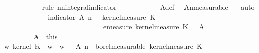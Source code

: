 \begin{isabellebody}
\ \ \ \ \ \ \ \ \ \ \isamarkupfalse%
\ {\isacharparenleft}{\kern0pt}rule\ nn{\isacharunderscore}{\kern0pt}integral{\isacharunderscore}{\kern0pt}indicator{\isacharparenright}{\kern0pt}\isanewline
\ \ \ \ \ \ \ \ \ \ \isamarkupfalse%
\ A{\isacharprime}{\kern0pt}{\isacharunderscore}{\kern0pt}def\ \isamarkupfalse%
\ A{\isacharunderscore}{\kern0pt}n{\isacharunderscore}{\kern0pt}measurable\ {\isasymomega}\ \isamarkupfalse%
\ auto\isanewline
\ \ \ \ \ \ \ \ \isamarkupfalse%
\ \isamarkupfalse%
\ {\isachardoublequoteopen}{\isacharparenleft}{\kern0pt}{\isasymintegral}\isactrlsup {\isacharplus}{\kern0pt}\ {\isasymomega}\ indicator\ {\isacharparenleft}{\kern0pt}A\ n{\isacharparenright}{\kern0pt}\ {\isacharparenleft}{\kern0pt}{\isasymomega}\ {\isasymomega}\ {\isasympartial}kernel{\isacharunderscore}{\kern0pt}measure\ K{\isacharunderscore}{\kern0pt}{}\ {\isacharparenleft}{\kern0pt}{\isasymomega}\ {\isasymomega}\ {\isacharequal}{\kern0pt}\isanewline
\ \ \ \ \ \ \ \ \ \ \ \ \ \ \ \ \ \ \ \ \ \ \ \ \ \ \ \ \ emeasure\ {\isacharparenleft}{\kern0pt}kernel{\isacharunderscore}{\kern0pt}measure\ K{\isacharunderscore}{\kern0pt}{}\ {\isacharparenleft}{\kern0pt}{\isasymomega}\ {\isasymomega}\ A{\isacharprime}{\kern0pt}{\isachardoublequoteclose}\isanewline
\ \ \ \ \ \ \ \ \ \ \isacommand{{\isachardot}{\kern0pt}}\isamarkupfalse%
\isanewline
\ \ \ \ \ \ \isacommand{{\isacharbraceright}{\kern0pt}}\isamarkupfalse%
\ \isamarkupfalse%
\ A\ {\isacharequal}{\kern0pt}\ this\isanewline
\ \ \ \ \ \ \isamarkupfalse%
\ \isamarkupfalse%
\ {\isachardoublequoteopen}{\isacharparenleft}{\kern0pt}{\isasymlambda}w{\isachardot}{\kern0pt}\ kernel\ K{\isacharunderscore}{\kern0pt}{}\ {\isacharparenleft}{\kern0pt}{\isasymomega}\ w{\isacharparenright}{\kern0pt}\ {\isacharbraceleft}{\kern0pt}{\isasymomega}\ {\isacharparenleft}{\kern0pt}w{\isacharcomma}{\kern0pt}\ {\isasymomega}\ {\isasymin}\ A\ n{\isacharbraceright}{\kern0pt}{\isacharparenright}{\kern0pt}\ {\isasymin}\ borel{\isacharunderscore}{\kern0pt}measurable\ {\isacharparenleft}{\kern0pt}kernel{\isacharunderscore}{\kern0pt}measure\ K{\isacharunderscore}{\kern0pt}{}\ {\isasymomega}\isanewline

\end{isabellebody}
